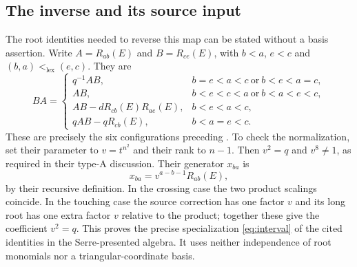 \documentclass[11pt]{article}
\theoremstyle{definition}
\theoremstyle{remark}
\begin{document}
\subsection{The inverse and its source input}
The root identities needed to reverse this map can be stated without a basis assertion. Write $A=R_{ab}(E)$ and $B=R_{ce}(E)$, with $b<a$, $e<c$ and $(b,a)<_{\mathrm{lex}}(e,c)$. They are
\begin{equation}\label{eq:interval}
 BA=\begin{cases}
 q^{-1}AB,& b=e<a<c\ \text{or}\ b<e<a=c,\\
 AB,&b<e<c<a\ \text{or}\ b<a<e<c,\\
 AB-dR_{cb}(E)R_{ae}(E),&b<e<a<c,\\
 qAB-qR_{cb}(E),&b<a=e<c.
 \end{cases}
\end{equation}
These are precisely the six configurations preceding \cite[Theorem 3.1]{CSS}. To check the normalization, set their parameter to $v=t^{n^2}$ and their rank to $n-1$. Then $v^2=q$ and $v^8\ne1$, as required in their type-A discussion. Their generator $x_{ba}$ is
\[
 x_{ba}=v^{a-b-1}R_{ab}(E),
\]
by their recursive definition. In the crossing case the two product scalings coincide. In the touching case the source correction has one factor $v$ and its long root has one extra factor $v$ relative to the product; together these give the coefficient $v^2=q$. This proves the precise specialization \eqref{eq:interval} of the cited identities in the Serre-presented algebra. It uses neither independence of root monomials nor a triangular-coordinate basis.
\end{document}
